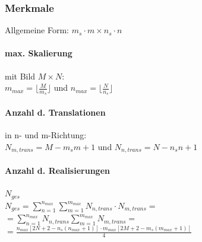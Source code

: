 \documentclass[6pt,a4paper]{scrartcl}
\begin{document}
\begin{multicols}{4}
{\subsubsection{Merkmale}
	Allgemeine Form: $m_s\cdot m \times n_s \cdot n$\\

\paragraph{max. Skalierung} mit Bild $M \times N$: \\
$m_{max} = \lfloor \frac{M}{m_s} \rfloor$ und $n_{max} = \lfloor \frac{N}{n_s} \rfloor$
\paragraph{Anzahl d. Translationen} in n- und m-Richtung:\\
$N_{m,trans} = M-m_s m +1$ und $N_{n,trans} = N-n_s n +1$

\paragraph{Anzahl d. Realisierungen} $N_{ges}$\\
$N_{ges} = \sum \limits_{n=1}^{n_{max}} \sum \limits_{m=1}^{m_{max}} N_{n,trans} \cdot N_{m,trans} =$\\
$=  \sum \limits_{n=1}^{n_{max}}  N_{n,trans}  \sum \limits_{m=1}^{m_{max}} N_{m,trans} = $\\
$= \frac{n_{max}[2N+2-n_s(n_{max}+1)] \cdot m_{max}[2M+2-m_s(m_{max}+1)]}{4}$\\


}
\end{multicols}
\end{document}
